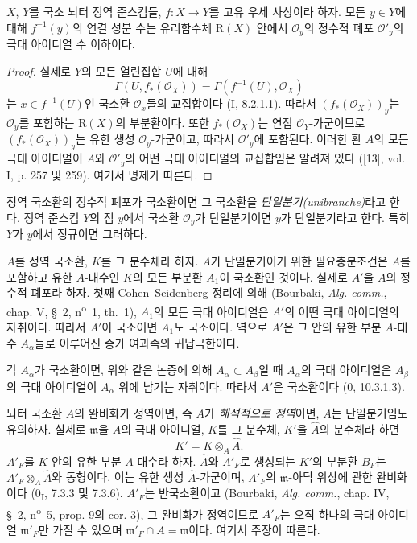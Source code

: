 \begin{proposition}[4.3.5]
\label{III.4.3.5-fr}
$X$, $Y$를 국소 뇌터 정역 준스킴들, $f:X\to Y$를 고유 우세
사상이라 하자. 모든 $y\in Y$에 대해 $f^{-1}(y)$의 연결 성분 수는
유리함수체 $\mathrm R(X)$ 안에서 $\mathcal O_y$의 정수적 폐포
$\mathcal O'_y$의 극대 아이디얼 수 이하이다.
\end{proposition}

\begin{proof}
실제로 $Y$의 모든 열린집합 $U$에 대해
\[
\Gamma(U,f_*(\mathcal O_X))
=\Gamma(f^{-1}(U),\mathcal O_X)
\]
는 $x\in f^{-1}(U)$인 국소환 $\mathcal O_x$들의 교집합이다
(I, 8.2.1.1). 따라서 $(f_*(\mathcal O_X))_y$는
$\mathcal O_y$를 포함하는 $\mathrm R(X)$의 부분환이다. 또한
$f_*(\mathcal O_X)$는 연접 $\mathcal O_Y$-가군이므로
$(f_*(\mathcal O_X))_y$는 유한 생성 $\mathcal O_y$-가군이고,
따라서 $\mathcal O'_y$에 포함된다. 이러한 환 $A$의 모든 극대
아이디얼이 $A$와 $\mathcal O'_y$의 어떤 극대 아이디얼의 교집합임은
알려져 있다 ([13], vol. I, p. 257 및 259). 여기서 명제가 따른다.
\end{proof}

\begin{definition}[4.3.6]
\label{III.4.3.6-fr}
정역 국소환의 정수적 폐포가 국소환이면 그 국소환을
\emph{단일분기(unibranche)}라고 한다. 정역 준스킴 $Y$의 점 $y$에서
국소환 $\mathcal O_y$가 단일분기이면 $y$가 단일분기라고 한다.
특히 $Y$가 $y$에서 정규이면 그러하다.
\end{definition}

$A$를 정역 국소환, $K$를 그 분수체라 하자. $A$가 단일분기이기 위한
필요충분조건은 $A$를 포함하고 유한 $A$-대수인 $K$의 모든 부분환
$A_1$이 국소환인 것이다. 실제로 $A'$을 $A$의 정수적 폐포라 하자.
첫째 Cohen--Seidenberg 정리에 의해 (Bourbaki,
\emph{Alg. comm.}, chap. V, \S~2, n\textsuperscript{o}~1, th.~1),
$A_1$의 모든 극대 아이디얼은 $A'$의 어떤 극대 아이디얼의 자취이다.
따라서 $A'$이 국소이면 $A_1$도 국소이다. 역으로 $A'$은 그 안의 유한
부분 $A$-대수 $A_\alpha$들로 이루어진 증가 여과족의 귀납극한이다.


각 $A_\alpha$가 국소환이면, 위와 같은 논증에 의해
$A_\alpha\subset A_\beta$일 때 $A_\alpha$의 극대 아이디얼은
$A_\beta$의 극대 아이디얼이 $A_\alpha$ 위에 남기는 자취이다. 따라서
$A'$은 국소환이다 (0, 10.3.1.3).

뇌터 국소환 $A$의 완비화가 정역이면, 즉 $A$가
\emph{해석적으로 정역}이면, $A$는 단일분기임도 유의하자. 실제로
$\mathfrak m$을 $A$의 극대 아이디얼, $K$를 그 분수체,
$K'$을 $\widehat A$의 분수체라 하면
\[
K'=K\otimes_A\widehat A.
\]
$A'_F$를 $K$ 안의 유한 부분 $A$-대수라 하자. $\widehat A$와
$A'_F$로 생성되는 $K'$의 부분환 $B_F$는
$A'_F\otimes_A\widehat A$와 동형이다. 이는 유한 생성
$\widehat A$-가군이며, $A'_F$의 $\mathfrak m$-아딕 위상에 관한
완비화이다 (0\textsubscript{I}, 7.3.3 및 7.3.6).
$A'_F$는 반국소환이고 (Bourbaki, \emph{Alg. comm.}, chap. IV,
\S~2, n\textsuperscript{o}~5, prop. 9의 cor. 3), 그 완비화가
정역이므로 $A'_F$는 오직 하나의 극대 아이디얼 $\mathfrak m'_F$만
가질 수 있으며 $\mathfrak m'_F\cap A=\mathfrak m$이다. 여기서
주장이 따른다.

